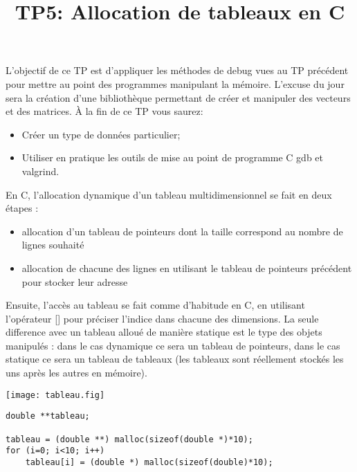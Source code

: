 \documentclass[10pt]{article}\usepackage[nu]{esial}
\begin{document}
\title{TP5: Allocation de tableaux en C}
\maketitle

\newcommand{\I}{\hspace{1.5em}}

L'objectif de ce TP est d'appliquer les méthodes de debug vues au TP précédent
pour mettre au point des programmes manipulant la mémoire. L'excuse du jour
sera la création d'une bibliothèque permettant de créer et manipuler des
vecteurs et des matrices. À la fin de ce TP vous saurez:
\begin{itemize}
\item Créer un type de données particulier;
\item Utiliser en pratique les outils de mise au point de programme C gdb et
  valgrind. 
\end{itemize}
\bigskip

 En C, l'allocation dynamique d'un tableau
multidimensionnel se fait
en deux étapes :\\
\begin{minipage}{.5\linewidth}
  \begin{itemize}
  \item allocation d'un tableau de pointeurs dont la taille correspond au
    nombre de lignes souhaité
  \item allocation de chacune des lignes en utilisant le tableau de pointeurs
    précédent pour stocker leur adresse
  \end{itemize}

  Ensuite, l'accès au tableau se fait comme d'habitude en C, en utilisant
  l'opérateur [] pour préciser l'indice dans chacune des dimensions. La seule
  difference avec un tableau alloué de manière statique est le type des objets
  manipulés : dans le cas dynamique ce sera un tableau de pointeurs, dans le
  cas statique ce sera un tableau de tableaux (les tableaux sont réellement
  stockés les uns après les autres en mémoire).

\end{minipage}\hfill\begin{minipage}{.48\linewidth}
  \texttt{[image: tableau.fig]}
\end{minipage}


\begin{Verbatim}[label=Exemple: allocation d'un tableau de 10*10 doubles (sans aucune vérification)]
double **tableau;

tableau = (double **) malloc(sizeof(double *)*10);
for (i=0; i<10; i++)
    tableau[i] = (double *) malloc(sizeof(double)*10);
\end{Verbatim}
\end{document}

